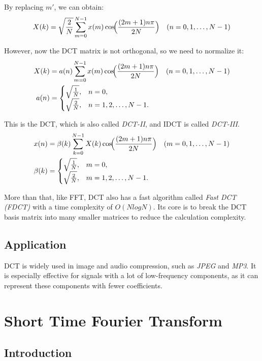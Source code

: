 \documentclass[10pt,a4paper,oneside,numbers=noenddot]{scrbook}
\theoremstyle{ctplain}
\theoremstyle{ctresult}
\begin{document}
By replacing $m'$, we can obtain:
\[
  X(k) = \sqrt{\frac{2}{N}}\sum_{m=0}^{N-1} x(m)\cos\!\Bigl(\frac{(2m+1)n\pi}{2N}\Bigr)
  \quad(n = 0,1,\dots,N-1)
\]

However, now the DCT matrix is not orthogonal, so we need to normalize it:
\begin{align}
  X(k) &= a(n)\sum_{m=0}^{N-1} x(m)\cos\!\Bigl(\frac{(2m+1)n\pi}{2N}\Bigr)
  \quad(n = 0,1,\dots,N-1)\\
  a(n) &= \begin{cases}
    \sqrt{\frac{1}{N}}, & n = 0,\\
    \sqrt{\frac{2}{N}}, & n = 1,2,\dots,N-1.
  \end{cases}
\end{align}

This is the DCT, which is also called \emph{DCT-II}, and IDCT is called \emph{DCT-III}.
\begin{align}
  x(n) &= \beta(k)\sum_{k=0}^{N-1} X(k)\cos\!\Bigl(\frac{(2m+1)n\pi}{2N}\Bigr)
  \quad(m = 0,1,\dots,N-1)\\
  \beta(k) &= \begin{cases}
    \sqrt{\frac{1}{N}}, & m = 0,\\
    \sqrt{\frac{2}{N}}, & m = 1,2,\dots,N-1.
  \end{cases}
\end{align}

More than that, like FFT, DCT also has a fast algorithm called \emph{Fast DCT (FDCT)}
with a time complexity of $O(NlogN)$. Its core is to break the DCT basis matrix into many
smaller matrices to reduce the calculation complexity.

\subsection{Application}

DCT is widely used in image and audio compression, such as \emph{JPEG} and \emph{MP3}.
It is especially effective for signals with a lot of low-frequency components, as it can
represent these components with fewer coefficients.


\section{Short Time Fourier Transform}

\subsection{Introduction}
\end{document}
